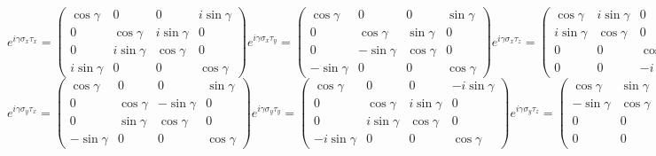 \documentclass[12pt]{extarticle}
\begin{document}
\scriptsize
\begin{equation*}
e^{i\gamma\sigma_x\tau_x}=
\begin{pmatrix}
    \cos\gamma & 0 & 0 & i\sin\gamma \\
    0 & \cos\gamma & i\sin\gamma & 0 \\
    0 & i\sin\gamma & \cos\gamma & 0 \\
    i\sin\gamma & 0 & 0 & \cos\gamma
\end{pmatrix}
e^{i\gamma\sigma_x\tau_y}=
\begin{pmatrix}
    \cos\gamma & 0 & 0 & \sin\gamma \\
    0 & \cos\gamma & \sin\gamma & 0 \\
    0 & -\sin\gamma & \cos\gamma & 0 \\
    -\sin\gamma & 0 & 0 & \cos\gamma
\end{pmatrix}
e^{i\gamma\sigma_x\tau_z}=
\begin{pmatrix}
    \cos\gamma & i\sin\gamma & 0 & 0 \\
    i\sin\gamma & \cos\gamma & 0 & 0 \\
    0 & 0 & \cos\gamma & -i\sin\gamma \\
    0 & 0 & -i\sin\gamma & \cos\gamma
\end{pmatrix}
\end{equation*}
\begin{equation*}
e^{i\gamma\sigma_y\tau_x}=
\begin{pmatrix}
    \cos\gamma & 0 & 0 & \sin\gamma \\
    0 & \cos\gamma & -\sin\gamma & 0 \\
    0 & \sin\gamma & \cos\gamma & 0 \\
    -\sin\gamma & 0 & 0 & \cos\gamma
\end{pmatrix}
e^{i\gamma\sigma_y\tau_y}=
\begin{pmatrix}
    \cos\gamma & 0 & 0 & -i\sin\gamma \\
    0 & \cos\gamma & i\sin\gamma & 0 \\
    0 & i\sin\gamma & \cos\gamma & 0 \\
    -i\sin\gamma & 0 & 0 & \cos\gamma
\end{pmatrix}
e^{i\gamma\sigma_y\tau_z}=
\begin{pmatrix}
    \cos\gamma & \sin\gamma & 0 & 0 \\
    -\sin\gamma & \cos\gamma & 0 & 0 \\
    0 & 0 & \cos\gamma & -\sin\gamma \\
    0 & 0 & \sin\gamma & \cos\gamma
\end{pmatrix}
\end{equation*}
\end{document}
